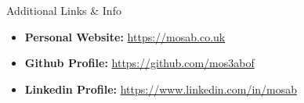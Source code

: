 \documentclass[]{mosabcv}
\begin{document}
\begin{cvsection}{Additional Links \& Info}
  \begin{cvsubsection}{}{}{}
    \begin{itemize}
      \item \textbf{Personal Website:}
        \href{https://mosab.co.uk}{https://mosab.co.uk}
      \item \textbf{Github Profile:}
        \href{https://github.com/mos3abof}{https://github.com/mos3abof}
      \item \textbf{Linkedin Profile:}
        \href{https://www.linkedin.com/in/mosab}{https://www.linkedin.com/in/mosab}
    \end{itemize}
  \end{cvsubsection}
\end{cvsection}
\end{document}

